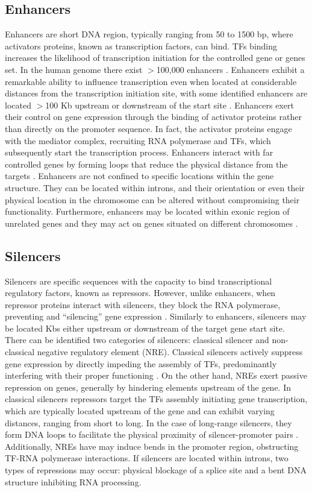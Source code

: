 \documentclass[a4paper, titlepage, openright]{book}
\begin{document}
\subsection{Enhancers}
Enhancers are short DNA region, typically ranging from 50 to 1500 bp, where activators proteins, known as transcription factors, can bind. TFs binding increases the likelihood of transcription initiation for the controlled gene or genes set. In the human genome there exist $>$100,000 enhancers \citep{pennacchio2013enhancers}. Enhancers exhibit a remarkable ability to influence transcription even when located at considerable distances from the transcription initiation site, with some identified enhancers are located $>$100 Kb upstream or downstream of the start site \citep{pennacchio2013enhancers}. Enhancers exert their control on gene expression through the binding of activator proteins rather than directly on the promoter sequence. In fact, the activator proteins engage with the mediator complex, recruiting RNA polymerase and TFs, which subsequently start the transcription process. Enhancers interact with far controlled genes by forming loops that reduce the physical distance from the targets \citep{schoenfelder2019long}. Enhancers are not confined to specific locations within the gene structure. They can be located within introns, and their orientation or even their physical location in the chromosome can be altered without compromising their functionality. Furthermore, enhancers may be located within exonic region of unrelated genes and they may act on genes situated on different chromosomes \citep{spilianakis2005interchromosomal}.

\subsection{Silencers}
Silencers are specific sequences with the capacity to bind transcriptional regulatory factors, known as repressors. However, unlike enhancers, when repressor proteins interact with silencers, they block the RNA polymerase, preventing and ``silencing'' gene expression \citep{pang2023identification}. Similarly to enhancers, silencers may be located Kbs either upstream or downstream of the target gene start site. There can be identified two categories of silencers: classical silencer and non-classical negative regulatory element (NRE). Classical silencers actively suppress gene expression by directly impeding the assembly of TFs, predominantly interfering with their proper functioning \citep{ogbourne1998transcriptional}. On the other hand, NREs exert passive repression on genes, generally by hindering elements upstream of the gene. In classical silencers repressors target the TFs assembly initiating gene transcription, which are typically located upstream of the gene and can exhibit varying distances, ranging from short to long. In the case of long-range silencers, they form DNA loops to facilitate the physical proximity of silencer-promoter pairs \citep{maston2006transcriptional}. Additionally, NREs have may induce bends in the promoter region, obstructing TF-RNA polymerase interactions. If silencers are located within introns, two types of repressions may occur: physical blockage of a splice site and a bent DNA structure inhibiting RNA processing.
\end{document}
